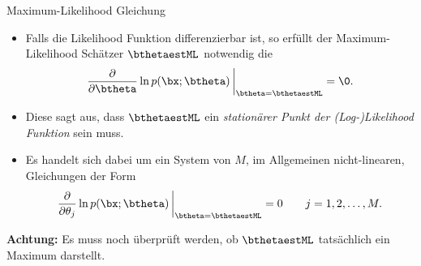 \begin{frame}{Maximum-Likelihood Gleichung}{}
	\begin{itemize}
		\item Falls die Likelihood Funktion differenzierbar ist, so erfüllt der Maximum-Likelihood Schätzer $\bthetaestML$
			notwendig die 
		\begin{equation*}
			\frac{\partial}{\partial \btheta} \ln p(\bx; \btheta)\,\bigg\vert_{\btheta = \bthetaestML} = \0.
		\end{equation*}
		\item Diese sagt aus, dass $\bthetaestML$ ein \textit{stationärer Punkt der (Log-)Likelihood Funktion} sein muss.
		\item Es handelt sich dabei um ein System von $M$, im Allgemeinen nicht-linearen, Gleichungen der Form
		\begin{equation*}
			\frac{\partial}{\partial \theta_j} \ln p(\bx; \btheta)\,\bigg\vert_{\btheta = \bthetaestML} = 0 \qquad j = 1, 2, \ldots, M.
		\end{equation*}
	\end{itemize}
	
	\begin{boxGray}
		\textbf{Achtung:} Es muss noch überprüft werden, ob $\bthetaestML$ tatsächlich ein Maximum darstellt.
	\end{boxGray}
\end{frame}


